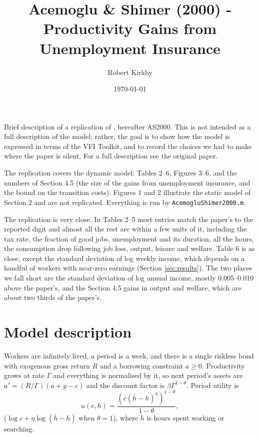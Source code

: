 \documentclass[11pt,fleqn]{article}
\begin{document}
\sloppy

\newcommand{\rob}[1]{{\noindent\color{blue}\bf #1}}
\newcommand{\robc}[1]{{\noindent\color{blue}\bf R: #1}}

\title{Acemoglu \& Shimer (2000) - Productivity Gains from Unemployment Insurance}
\author{Robert Kirkby}
\date{\today}
\maketitle

Brief description of a replication of \cite*{AcemogluShimer2000}, hereafter AS2000. This is not intended as a full description of the model; rather, the goal is to show how the model is expressed in terms of the VFI Toolkit, and to record the choices we had to make where the paper is silent. For a full description see the original paper.

The replication covers the dynamic model: Tables 2--6, Figures 3--6, and the numbers of Section 4.5 (the size of the gains from unemployment insurance, and the bound on the transition costs). Figures 1 and 2 illustrate the static model of Section 2 and are not replicated. Everything is run by \verb|AcemogluShimer2000.m|.

The replication is very close. In Tables 2--5 most entries match the paper's to the reported digit and almost all the rest are within a few units of it, including the tax rate, the fraction of good jobs, unemployment and its duration, all the hours, the consumption drop following job loss, output, leisure and welfare. Table 6 is as close, except the standard deviation of log weekly income, which depends on a handful of workers with near-zero earnings (Section \ref{sec:results}). The two places we fall short are the standard deviation of log annual income, mostly 0.005--0.010 above the paper's, and the Section 4.5 gains in output and welfare, which are about two thirds of the paper's.


\section{Model description}

Workers are infinitely lived, a period is a week, and there is a single riskless bond with exogenous gross return $R$ and a borrowing constraint $a\geq 0$. Productivity grows at rate $\Gamma$ and everything is normalised by it, so next period's assets are $a' = (R/\Gamma)(a + y - c)$ and the discount factor is $\beta\Gamma^{1-\theta}$. Period utility is
\begin{equation*}
u(c,h) = \frac{(c(\bar{h}-h)^\eta)^{1-\theta}}{1-\theta},
\end{equation*}
($\log c + \eta \log(\bar{h}-h)$ when $\theta=1$), where $h$ is hours spent working or searching.
\end{document}
